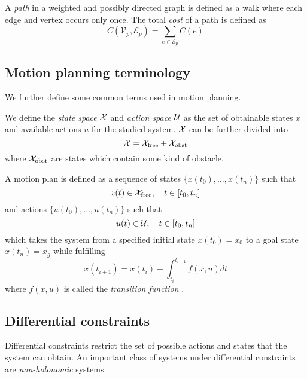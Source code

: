 \begin{definition}[Path]
    A \textit{path} in a weighted and possibly directed graph is defined as a walk where each edge and vertex occurs only once.
    The total \textit{cost} of a path is defined as
    \begin{equation}
        C(\mathcal{V}_p, \mathcal{E}_p)=\sum_{e\in\mathcal{E}_p}C(e)
    \end{equation}
\end{definition}

\subsection{Motion planning terminology}
We further define some common terms used in motion planning.

\begin{definition}
    We define the \textit{state space} $\mathcal{X}$ and \textit{action space}
    $\mathcal{U}$ as the set of obtainable states $x$ and available actions $u$ for the
    studied system.
    $\mathcal{X}$ can be further divided into
    \begin{equation}
        \mathcal{X} = \mathcal{X}_{\text{free}} + \mathcal{X}_{\text{obst}}
    \end{equation}
    where $\mathcal{X}_{\text{obst}}$ are states which contain some kind of obstacle. 
\end{definition}

\begin{definition}
    A motion plan is defined as a sequence of states $\{x(t_0),\hdots, x(t_n)\}$ such that
    \begin{equation}
        x(t)\in\mathcal{X}_{\text{free}}, \quad t\in[t_0,t_n]
    \end{equation}
    and actions $\{u(t_0),\hdots,u(t_n)\}$ such that
    \begin{equation}
        u(t)\in\mathcal{U}, \quad t\in[t_0,t_n]
    \end{equation}
    which takes the system from a specified initial state $x(t_0)=x_0$ to a 
    goal state $x(t_n)=x_g$ while fulfilling
    \begin{equation}
        x(t_{i+1})=x(t_i) + \int_{t_i}^{t_{i+1}} f(x, u) dt
    \end{equation}
    where $f(x, u)$ is called the \textit{transition function} \cite{planning_algorithms}.
\end{definition}

\subsection{Differential constraints}
Differential constraints restrict the set of possible actions and states that 
the system can obtain. An important class of systems under differential constraints 
are \textit{non-holonomic} systems.

